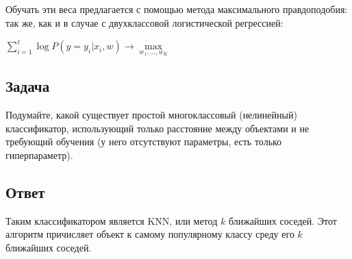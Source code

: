 Обучать эти веса предлагается с помощью метода максимального правдоподобия: так же, как и в случае с двухклассовой логистической регрессией:

$\sum\limits_{i=1}^\ell \log P(y=y_i|x_i,w) \xrightarrow{} \max\limits_{w_1,...,w_K}$

\subsection*{Задача}

Подумайте, какой существует простой многоклассовый (нелинейный) классификатор, использующий только расстояние между объектами и не требующий обучения (у него отсутствуют параметры, есть только гиперпараметр).

\subsection*{Ответ}

Таким классификатором является KNN, или метод $k$ ближайших соседей. Этот алгоритм причисляет объект к самому популярному классу среду его $k$ ближайших соседей.
